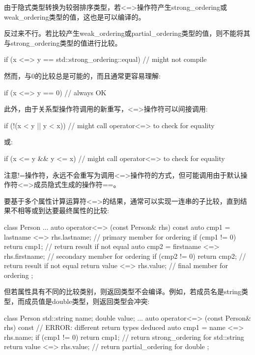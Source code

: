 由于隐式类型转换为较弱排序类型，若<=>操作符产生strong\_ordering或weak\_ordering类型的值，这也是可以编译的。

反过来不行。若比较产生weak\_ordering或partial\_ordering类型的值，则不能将其与strong\_ordering类型的值进行比较。

\begin{cpp}
if (x <=> y == std::strong_ordering::equal) // might not compile
\end{cpp}

然而，与0的比较总是可能的，而且通常更容易理解:

\begin{cpp}
if (x <=> y == 0) // always OK
\end{cpp}

此外，由于关系型操作符调用的新重写，<=>操作符可以间接调用:

\begin{cpp}
if (!(x < y || y < x)) // might call operator<=> to check for equality
\end{cpp}

或:

\begin{cpp}
if (x <= y && y <= x) // might call operator<=> to check for equality
\end{cpp}

注意!=操作符，永远不会重写为调用<=>操作符的方式，但可能调用由于默认操作符<=>成员隐式生成的操作符==。


要基于多个属性计算运算符<=>的结果，通常可以实现一连串的子比较，直到结果不相等或到达要最终属性的比较:

\begin{cpp}
class Person {
	...
	auto operator<=> (const Person& rhs) const {
		auto cmp1 = lastname <=> rhs.lastname; // primary member for ordering
		if (cmp1 != 0) return cmp1; // return result if not equal
		auto cmp2 = firstname <=> rhs.firstname; // secondary member for ordering
		if (cmp2 != 0) return cmp2; // return result if not equal
		return value <=> rhs.value; // final member for ordering
	}
};
\end{cpp}

但若属性具有不同的比较类别，则返回类型不会编译。例如，若成员名是string类型，而成员值是double类型，则返回类型会冲突:

\begin{cpp}
class Person {
	std::string name;
	double value;
	...
	auto operator<=> (const Person& rhs) const { // ERROR: different return types deduced
		auto cmp1 = name <=> rhs.name;
		if (cmp1 != 0) return cmp1; // return strong_ordering for std::string
		return value <=> rhs.value; // return partial_ordering for double
	}
};
\end{cpp}

